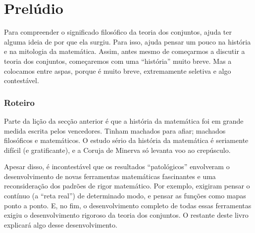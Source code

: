 %


\problemsperchapter

\allowdisplaybreaks

\frontmatter

\OLPfrontmatter



\mainmatter

\part{Prelúdio}


Para compreender o significado filosófico da teoria dos conjuntos, ajuda
ter alguma ideia de por que ela surgiu. Para isso, ajuda pensar um pouco
na história e na mitologia da matemática. Assim, antes mesmo de
começarmos a discutir a teoria dos conjuntos, começaremos com uma
``história'' muito breve. Mas a colocamos entre aspas, porque é muito breve,
extremamente seletiva e algo contestável.


\section{Roteiro}

Parte da lição da secção anterior é que a história da matemática foi em grande
medida escrita pelos vencedores. Tinham machados para afiar; machados
filosóficos e matemáticos. O estudo sério da história da matemática é
seriamente difícil (e gratificante), e a Coruja de Minerva só levanta
voo ao crepúsculo.

Apesar disso, é incontestável que os resultados ``patológicos''
envolveram o desenvolvimento de novas ferramentas matemáticas fascinantes
e uma reconsideração dos padrões de rigor matemático. Por exemplo,
exigiram pensar o contínuo (a ``reta real'') de determinado modo,
e pensar as funções como mapas ponto a ponto. E, no fim, o
desenvolvimento completo de todas essas ferramentas exigiu o
desenvolvimento rigoroso da teoria dos conjuntos. O restante deste livro
explicará algo desse desenvolvimento.

